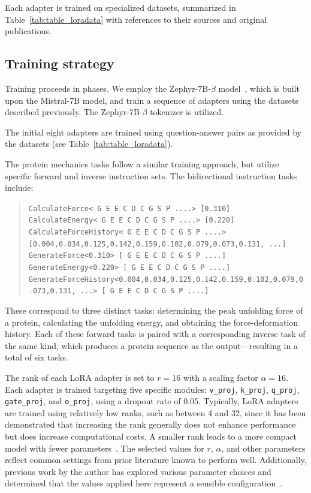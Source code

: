 Each adapter is trained on specialized datasets, summarized in Table~\ref{tab:table_loradata} with references to their sources and original publications.

\subsection{Training strategy} Training proceeds in phases. We employ the Zephyr-7B-$\beta$ model~\cite{HuggingFaceH4/zephyr-7b-betaFace}, which is built upon the Mistral-7B model\cite{Jiang2023Mistral7B}, and train a sequence of adapters using the datasets described previously. The Zephyr-7B-$\beta$ tokenizer is utilized.

The initial eight adapters are trained using question-answer pairs as provided by the datasets (see Table~\ref{tab:table_loradata}).

The protein mechanics tasks follow a similar training approach, but utilize specific forward and inverse instruction sets. The bidirectional instruction tasks include:

\begin{quote}
\tiny {\texttt{CalculateForce< G E E C D C G S P ....> [0.310]\\
CalculateEnergy< G E E C D C G S P ....> [0.220]\\ 
CalculateForceHistory< G E E C D C G S P ....> [0.004,0.034,0.125,0.142,0.159,0.102,0.079,0.073,0.131, ...]\\
GenerateForce<0.310>\,[ G E E C D C G S P ....]\\
GenerateEnergy<0.220>\,[ G E E C D C G S P ....]\\
GenerateForceHistory<0.004,0.034,0.125,0.142,0.159,0.102,0.079,0.073,0.131, ...>\,[ G E E C D C G S P ....] }}
\end{quote}

These correspond to three distinct tasks: determining the peak unfolding force of a protein, calculating the unfolding energy, and obtaining the force-deformation history. Each of these forward tasks is paired with a corresponding inverse task of the same kind, which produces a protein sequence as the output—resulting in a total of six tasks.

The rank of each LoRA adapter is set to $r=16$ with a scaling factor $\alpha=16$. Each adapter is trained targeting five specific modules: \texttt{v\_proj}, \texttt{k\_proj}, \texttt{q\_proj}, \texttt{gate\_proj}, and \texttt{o\_proj}, using a dropout rate of 0.05. Typically, LoRA adapters are trained using relatively low ranks, such as between 4 and 32, since it has been demonstrated that increasing the rank generally does not enhance performance but does increase computational costs. A smaller rank leads to a more compact model with fewer parameters~\cite{hu2021lora}. The selected values for $r$, $\alpha$, and other parameters reflect common settings from prior literature known to perform well. Additionally, previous work by the author has explored various parameter choices and determined that the values applied here represent a sensible configuration~\cite{Luu2023BioinspiredLLM:Materials}.

